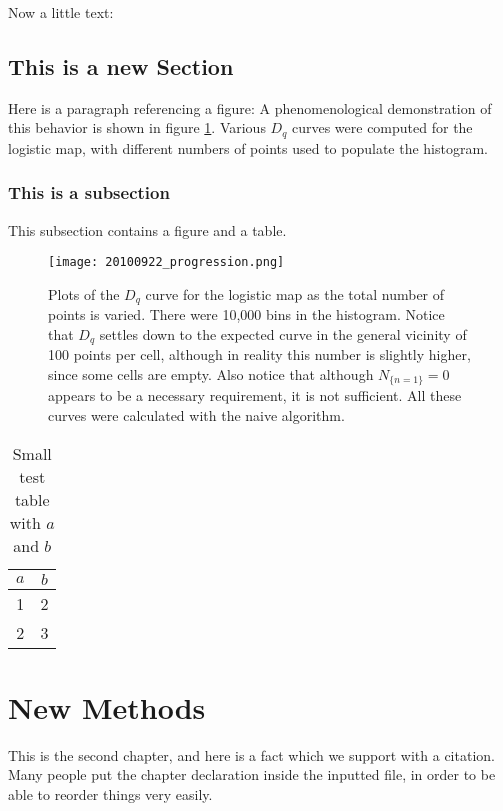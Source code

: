 \documentclass[draft, masters]{csuthesis} %
\begin{document}
Now a little text: \lipsum[1]

\section{This is a new Section}

Here is a paragraph referencing a figure: A phenomenological demonstration of this behavior is shown in figure \ref{2010_09_sparse1d}.  Various $D_q$ curves were computed for the logistic map, with different numbers of points used to populate the histogram.

\subsection{This is a subsection}

This subsection contains a figure and a table. \lipsum[1-2]

\begin{figure}[!ht]
\texttt{[image: 20100922\_progression.png]}
\caption[Plots demonstrating the effect of sparse data on $D_q$ convergence.]{Plots of the $D_q$ curve for the logistic map as the total number of points is varied.  There were 10,000 bins in the histogram.  Notice that $D_q$ settles down to the expected curve in the general vicinity of 100 points per cell, although in reality this number is slightly higher, since some cells are empty.  Also notice that although $N_{\{n=1\}}=0$ appears to be a necessary requirement, it is not sufficient.  All these curves were calculated with the naive algorithm. \label{2010_09_sparse1d}}
\end{figure}

\begin{table}
\caption[Small Table]{Small test table with $a$ and $b$}
\label{table:smalltab}
\begin{tabular}{c|c}
$a$ & $b$ \\
\hline
1 & 2 \\
2 & 3 \\
\end{tabular}
\end{table}

\chapter{New Methods}

This is the second chapter, and here is a fact which we support with a citation\cite{coxlittleoshea}.  Many people put the chapter declaration inside the inputted file\cite{Yorke1989}, in order to be able to reorder things very easily\cite{robot_homotopy}.  
\end{document}
